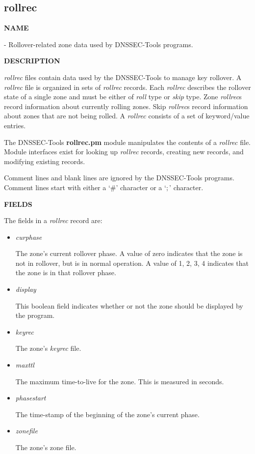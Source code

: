 \clearpage

\subsection{\bf rollrec}

{\bf NAME}

 - Rollover-related zone data used by DNSSEC-Tools programs.

{\bf DESCRIPTION}

{\it rollrec} files contain data used by the DNSSEC-Tools to manage key
rollover.  A {\it rollrec} file is organized in sets of {\it rollrec} records.
Each {\it rollrec} describes the rollover state of a single zone and must be
either of {\it roll} type or {\it skip} type.  Zone {\it rollrec}s record
information about currently rolling zones.  Skip {\it rollrec}s record
information about zones that are not being rolled.  A {\it rollrec} consists
of a set of keyword/value entries.

The DNSSEC-Tools {\bf rollrec.pm} module manipulates the contents of a {\it
rollrec} file.  Module interfaces exist for looking up {\it rollrec} records,
creating new records, and modifying existing records.

Comment lines and blank lines are ignored by the DNSSEC-Tools programs.
Comment lines start with either a `\#' character or a `$;$' character.

{\bf FIELDS}

The fields in a {\it rollrec} record are:

\begin{itemize}

\item {\it curphase}

The zone's current rollover phase.  A value of zero indicates that the zone
is not in rollover, but is in normal operation.  A value of 1, 2, 3, 4
indicates that the zone is in that rollover phase.

\item {\it display}

This boolean field indicates whether or not the zone should be displayed by
the  program.

\item {\it keyrec}

The zone's {\it keyrec} file.

\item {\it maxttl}

The maximum time-to-live for the zone.  This is measured in seconds.

\item {\it phasestart}

The time-stamp of the beginning of the zone's current phase.

\item {\it zonefile}

The zone's zone file.

\end{itemize}


